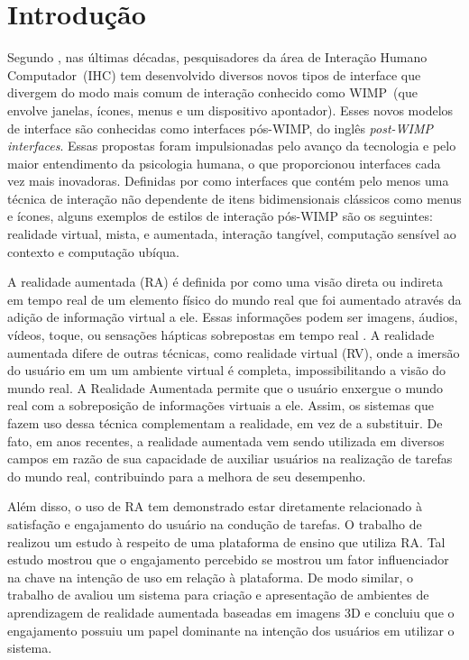 \documentclass[../main.tex]{subfiles}
\begin{document}
\chapter{Introdução}\label{cap:introducao}


Segundo , nas últimas décadas, pesquisadores da área de Interação Humano Computador~(IHC) tem desenvolvido diversos novos tipos de interface que divergem do modo mais comum de interação conhecido como WIMP~(que envolve janelas, ícones, menus e um dispositivo apontador). Esses novos modelos de interface são conhecidas como interfaces pós-WIMP, do inglês \emph{post-WIMP interfaces}. Essas propostas foram impulsionadas pelo avanço da tecnologia  e pelo maior entendimento da psicologia humana, o que proporcionou interfaces cada vez mais inovadoras. Definidas por  como interfaces que contém pelo menos uma técnica de interação não dependente de itens bidimensionais clássicos como menus e ícones, alguns exemplos de estilos de interação pós-WIMP são os seguintes: realidade virtual, mista, e aumentada, interação tangível, computação sensível ao contexto e computação ubíqua.

A realidade aumentada (RA) é definida por  como uma visão direta ou indireta em tempo real de um elemento físico do mundo real que foi aumentado através da adição de informação virtual a ele. Essas informações podem ser imagens, áudios, vídeos, toque, ou sensações hápticas sobrepostas em tempo real \cite{buchmann2004fingartips}. A realidade aumentada difere de outras técnicas, como realidade virtual (RV), onde a imersão do usuário em um um ambiente virtual é completa, impossibilitando a visão do mundo real. A Realidade Aumentada permite que o usuário enxergue o mundo real com a sobreposição de informações virtuais a ele. Assim, os sistemas que fazem uso dessa técnica complementam a realidade, em vez de a substituir. De fato, em anos recentes, a realidade aumentada vem sendo utilizada em diversos campos em razão de sua capacidade de auxiliar usuários na realização de tarefas do mundo real, contribuindo para a melhora de seu desempenho. 



Além disso, o uso de RA tem demonstrado estar diretamente relacionado à satisfação e engajamento do usuário na condução de tarefas. O trabalho de  realizou um estudo à respeito de uma plataforma de ensino que utiliza RA. Tal estudo mostrou que o engajamento percebido se mostrou um fator influenciador na chave na intenção de uso em relação à plataforma. De modo similar, o trabalho de  avaliou um sistema para criação e apresentação de ambientes de aprendizagem de realidade aumentada baseadas em imagens 3D e concluiu que o engajamento possuiu um papel dominante na intenção dos usuários em utilizar o sistema.
\end{document}
